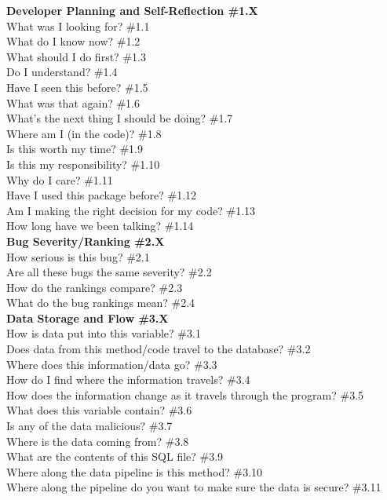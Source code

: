 \documentclass[10pt,journal,compsoc]{IEEEtran}
\begin{document}
\noindent\textbf{Developer Planning and Self-Reflection \#1.X} \\
	What was I looking for?  \#1.1 \\
	What do I know now? \#1.2 \\
	What should I do first? \#1.3 \\
	Do I understand? \#1.4 \\
	Have I seen this before?  \#1.5 \\
	What was that again? \#1.6 \\
	What's the next thing I should be doing?  \#1.7 \\
	Where am I (in the code)?  \#1.8 \\
	Is this worth my time? \#1.9 \\
	Is this my responsibility?  \#1.10 \\
	Why do I care? \#1.11 \\
	Have I used this package before? \#1.12 \\
	Am I making the right decision for my code? \#1.13 \\
	How long have we been talking? \#1.14 \\
\textbf{Bug Severity/Ranking \#2.X} \\
	How serious is this bug? \#2.1 \\
	Are all these bugs the same severity? \#2.2 \\
	How do the rankings compare? \#2.3 \\
	What do the bug rankings mean? \#2.4 \\
\textbf{Data Storage and Flow \#3.X} \\
	How is data put into this variable? \#3.1 \\
	Does data from this method/code travel to the database? \#3.2 \\
	Where does this information/data go? \#3.3 \\
	How do I find where the information travels? \#3.4 \\
	How does the information change as it travels through the program? \#3.5 \\
	What does this variable contain? \#3.6 \\
	Is any of the data malicious?  \#3.7 \\
	Where is the data coming from? \#3.8 \\
	What are the contents of this SQL file? \#3.9 \\
	Where along the data pipeline is this method? \#3.10 \\
	Where along the pipeline do you want to make sure the data is secure? \#3.11 \\
\end{document}

